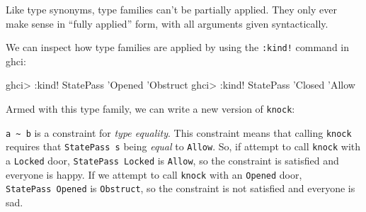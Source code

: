 \documentclass[]{article}
\newenvironment{Shaded}{}{}
\newcommand{\DataTypeTok}[1]{\textcolor[rgb]{0.56,0.13,0.00}{#1}}
\newcommand{\FunctionTok}[1]{\textcolor[rgb]{0.02,0.16,0.49}{#1}}
\newcommand{\NormalTok}[1]{#1}
\newcommand{\OtherTok}[1]{\textcolor[rgb]{0.00,0.44,0.13}{#1}}
\newcommand{\StringTok}[1]{\textcolor[rgb]{0.25,0.44,0.63}{#1}}
\begin{document}
Like type synonyms, type families can't be partially applied. They only ever
make sense in ``fully applied'' form, with all arguments given syntactically.

We can inspect how type families are applied by using the \texttt{:kind!}
command in ghci:

\begin{Shaded}
\begin{Highlighting}[]
\NormalTok{ghci}\FunctionTok{>} \FunctionTok{:}\NormalTok{kind}\FunctionTok{!} \DataTypeTok{StatePass}\NormalTok{ '}\DataTypeTok{Opened}
\NormalTok{'}\DataTypeTok{Obstruct}
\NormalTok{ghci}\FunctionTok{>} \FunctionTok{:}\NormalTok{kind}\FunctionTok{!} \DataTypeTok{StatePass}\NormalTok{ '}\DataTypeTok{Closed}
\NormalTok{'}\DataTypeTok{Allow}
\end{Highlighting}
\end{Shaded}

Armed with this type family, we can write a new version of \texttt{knock}:

\begin{Shaded}
\end{Shaded}

\texttt{a\ \textasciitilde{}\ b} is a constraint for \emph{type equality}. This
constraint means that calling \texttt{knock} requires that \texttt{StatePass\ s}
being \emph{equal} to \texttt{\textquotesingle{}Allow}. So, if attempt to call
\texttt{knock} with a \texttt{\textquotesingle{}Locked} door,
\texttt{StatePass\ \textquotesingle{}Locked} is
\texttt{\textquotesingle{}Allow}, so the constraint is satisfied and everyone is
happy. If we attempt to call \texttt{knock} with an
\texttt{\textquotesingle{}Opened} door,
\texttt{StatePass\ \textquotesingle{}Opened} is
\texttt{\textquotesingle{}Obstruct}, so the constraint is not satisfied and
everyone is sad.
\end{document}
